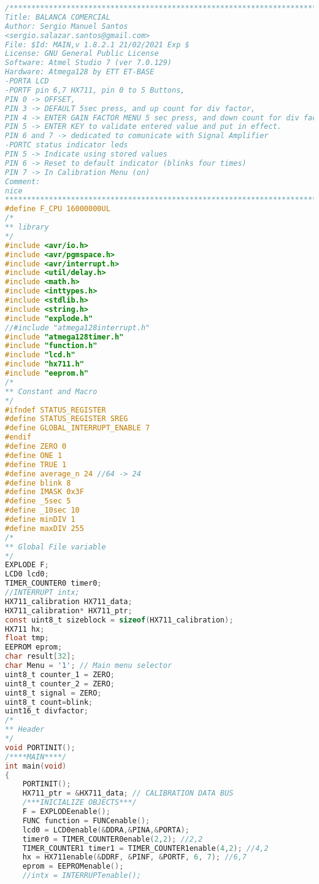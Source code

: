 \begin{lstlisting}[language=C, caption={main.c}, label=main-c, captionpos=b]
/************************************************************************
Title: BALANCA COMERCIAL
Author: Sergio Manuel Santos
<sergio.salazar.santos@gmail.com>
File: $Id: MAIN,v 1.8.2.1 21/02/2021 Exp $
License: GNU General Public License
Software: Atmel Studio 7 (ver 7.0.129)
Hardware: Atmega128 by ETT ET-BASE
-PORTA LCD
-PORTF pin 6,7 HX711, pin 0 to 5 Buttons, 
PIN 0 -> OFFSET, 
PIN 3 -> DEFAULT 5sec press, and up count for div factor, 
PIN 4 -> ENTER GAIN FACTOR MENU 5 sec press, and down count for div factor, 
PIN 5 -> ENTER KEY to validate entered value and put in effect.
PIN 6 and 7 -> dedicated to comunicate with Signal Amplifier
-PORTC status indicator leds
PIN 5 -> Indicate using stored values
PIN 6 -> Reset to default indicator (blinks four times)
PIN 7 -> In Calibration Menu (on)
Comment:
nice
************************************************************************/
#define F_CPU 16000000UL
/*
** library
*/
#include <avr/io.h>
#include <avr/pgmspace.h>
#include <avr/interrupt.h>
#include <util/delay.h>
#include <math.h>
#include <inttypes.h>
#include <stdlib.h>
#include <string.h>
#include "explode.h"
//#include "atmega128interrupt.h"
#include "atmega128timer.h"
#include "function.h"
#include "lcd.h"
#include "hx711.h"
#include "eeprom.h"
/*
** Constant and Macro
*/
#ifndef STATUS_REGISTER
#define STATUS_REGISTER SREG
#define GLOBAL_INTERRUPT_ENABLE 7
#endif
#define ZERO 0
#define ONE 1
#define TRUE 1
#define average_n 24 //64 -> 24
#define blink 8
#define IMASK 0x3F
#define _5sec 5
#define _10sec 10
#define minDIV 1
#define maxDIV 255
/*
** Global File variable
*/
EXPLODE F;
LCD0 lcd0;
TIMER_COUNTER0 timer0;
//INTERRUPT intx;
HX711_calibration HX711_data;
HX711_calibration* HX711_ptr;
const uint8_t sizeblock = sizeof(HX711_calibration);
HX711 hx;
float tmp;
EEPROM eprom;
char result[32];
char Menu = '1'; // Main menu selector
uint8_t counter_1 = ZERO;
uint8_t counter_2 = ZERO;
uint8_t signal = ZERO;
uint8_t count=blink;
uint16_t divfactor;
/*
** Header
*/
void PORTINIT();
/****MAIN****/
int main(void)
{
	PORTINIT();
	HX711_ptr = &HX711_data; // CALIBRATION DATA BUS
	/***INICIALIZE OBJECTS***/
	F = EXPLODEenable();
	FUNC function = FUNCenable();
	lcd0 = LCD0enable(&DDRA,&PINA,&PORTA);
	timer0 = TIMER_COUNTER0enable(2,2); //2,2
	TIMER_COUNTER1 timer1 = TIMER_COUNTER1enable(4,2); //4,2
	hx = HX711enable(&DDRF, &PINF, &PORTF, 6, 7); //6,7
	eprom = EEPROMenable();
	//intx = INTERRUPTenable();

\end{lstlisting}
